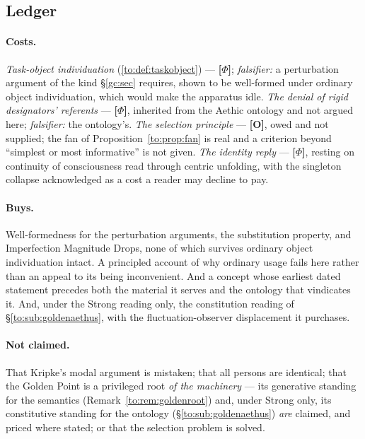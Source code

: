 \documentclass[11pt]{article}
\numberwithin{equation}{section}
\theoremstyle{plain}
\theoremstyle{definition}
\theoremstyle{remark}
\begin{document}
\subsection{Ledger}\label{to:sub:ledger}

\paragraph{Costs.} \emph{Task-object individuation}
(\ref{to:def:taskobject}) --- \textbf{[$\Phi$]};
\emph{falsifier:} a perturbation argument of the kind
\S\ref{gc:sec} requires, shown to be well-formed under ordinary object
individuation, which would make the apparatus idle. \emph{The denial of
rigid designators' referents} --- \textbf{[$\Phi$]}, inherited from the
Aethic ontology \cite{Aethus} and not argued here;
\emph{falsifier:} the ontology's. \emph{The selection principle} ---
\textbf{[O]}, owed and not supplied; the fan of
Proposition~\ref{to:prop:fan} is real and a criterion beyond
``simplest or most informative'' is not given. \emph{The identity reply}
--- \textbf{[$\Phi$]}, resting on continuity of consciousness read
through centric unfolding, with the singleton collapse acknowledged as
a cost a reader may decline to pay.

\paragraph{Buys.} Well-formedness for the perturbation arguments, the
substitution property, and Imperfection Magnitude Drops, none of which
survives ordinary object individuation intact. A principled account of
why ordinary usage fails here rather than an appeal to its being
inconvenient. And a concept whose earliest dated statement precedes both
the material it serves and the ontology that vindicates it. And, under
the Strong reading only, the constitution reading of
\S\ref{to:sub:goldenaethus}, with the fluctuation-observer
displacement it purchases.

\paragraph{Not claimed.} That Kripke's modal argument is mistaken; that
all persons are identical; that the Golden Point is a privileged root \emph{of the
machinery} --- its generative standing for the semantics
(Remark~\ref{to:rem:goldenroot}) and, under Strong only, its
constitutive standing for the ontology (\S\ref{to:sub:goldenaethus})
\emph{are} claimed, and priced where stated; or that the selection
problem is solved.
\end{document}

